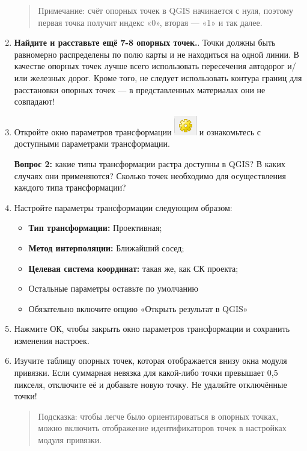 \documentclass[
  12pt,
]{book}
\providecommand{\tightlist}{%
  \setlength{\itemsep}{0pt}\setlength{\parskip}{0pt}}
\begin{document}
\begin{enumerate}
  \begin{quote}
  Примечание: счёт опорных точек в QGIS начинается с нуля, поэтому первая точка получит индекс «0», вторая --- «1» и так далее.
  \end{quote}
\item
  \textbf{Найдите и расставьте ещё 7-8 опорных точек.}. Точки должны быть равномерно распределены по полю карты и не находиться на одной линии. В качестве опорных точек лучше всего использовать пересечения автодорог и/или железных дорог. Кроме того, не следует использовать контура границ для расстановки опорных точек --- в представленных материалах они не совпадают!
\item
  Откройте окно параметров трансформации \includegraphics{images/Ex05/parameters.png} и ознакомьтесь с доступными параметрами трансформации.

  \textbf{Вопрос 2:} какие типы трансформации растра доступны в QGIS? В каких случаях они применяются? Сколько точек необходимо для осуществления каждого типа трансформации?
\item
  Настройте параметры трансформации следующим образом:

  \begin{itemize}
  \tightlist
  \item
    \textbf{Тип трансформации:} Проективная;
  \item
    \textbf{Метод интерполяции:} Ближайший сосед;
  \item
    \textbf{Целевая система координат:} такая же, как СК проекта;
  \item
    Остальные параметры оставьте по умолчанию
  \item
    Обязательно включите опцию «Открыть результат в QGIS»
  \end{itemize}
\item
  Нажмите ОК, чтобы закрыть окно параметров трансформации и сохранить изменения настроек.
\item
  Изучите таблицу опорных точек, которая отображается внизу окна модуля привязки. Если суммарная невязка для какой-либо точки превышает 0,5 пикселя, отключите её и добавьте новую точку. Не удаляйте отключённые точки!

  \begin{quote}
  Подсказка: чтобы легче было ориентироваться в опорных точках, можно включить отображение идентификаторов точек в настройках модуля привязки.
  \end{quote}


\end{enumerate}
\end{document}
